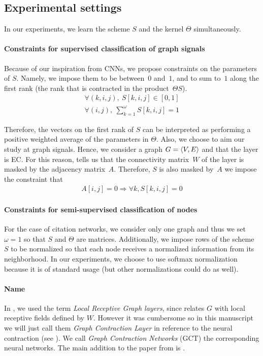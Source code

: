 \subsection{Experimental settings}
In our experiments, we learn the scheme $S$ and the kernel $\Theta$ simultaneously.

\paragraph{Constraints for supervised classification of graph signals}

Because of our inspiration from CNNs, we propose constraints on the parameters of $S$. Namely, we impose them to be between~$0$ and~$1$, and to sum to~$1$ along the first rank (the rank that is contracted in the product~$\Theta S$).
\begin{gather}
\forall (k,i,j),~S[k,i,j] \in [0,1]\\
\forall (i,j),~\displaystyle \sum_{k=1}^\omega S[k,i,j] = 1
\end{gather}

Therefore, the vectors on the first rank of $S$ can be interpreted as performing a positive weighted average of the parameters in $\Theta$.
Also, we choose to aim our study at graph signals. Hence, we consider a graph $G = \langle V, E \rangle$ and that the layer is EC. For this reason,  tells us that the connectivity matrix~$W$ of the layer is masked by the adjacency matrix~$A$. Therefore, $S$ is also masked by~$A$ \ie we impose the constraint that
\begin{gather}
A[i,j] = 0 \Rightarrow \forall k, S[k,i,j] = 0
\end{gather}

\paragraph{Constraints for semi-supervised classification of nodes}

For the case of citation networks, we consider only one graph and thus we set $\omega = 1$ so that $S$ and $\Theta$ are matrices. Additionally, we impose rows of the scheme $S$ to be normalized so that each node receives a normalized information from its neighborhood. In our experiments, we choose to use softmax normalization because it is of standard usage (but other normalizations could do as well).

\paragraph{Name}
In \citep{vialatte2017learning}, we used the term \emph{Local Receptive Graph layers}, since  relates $G$ with local receptive fields defined by $W$. However it was cumbersome so in this manuscript we will just call them \emph{Graph Contraction Layer} in reference to the neural contraction (see ). We call \emph{Graph Contraction Networks} (GCT) the corresponding neural networks. The main addition to the paper \citep{vialatte2017learning} from  is .

